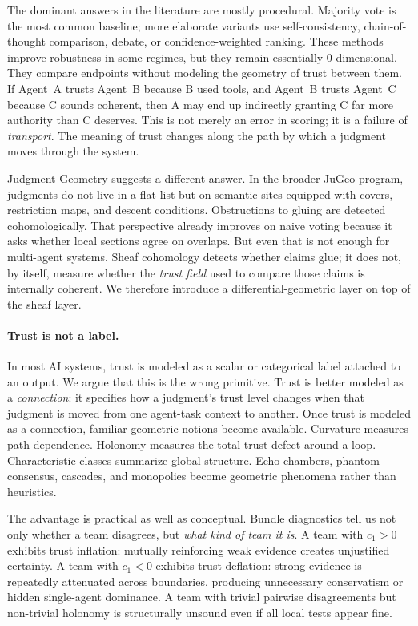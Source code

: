 \documentclass[11pt]{article}
\newcommand{\Chern}{c_1}
\begin{document}
The dominant answers in the literature are mostly procedural.  Majority vote is
the most common baseline; more elaborate variants use self-consistency,
chain-of-thought comparison, debate, or confidence-weighted ranking.  These
methods improve robustness in some regimes, but they remain essentially
0-dimensional.  They compare endpoints without modeling the geometry of trust
between them.  If Agent~A trusts Agent~B because B used tools, and Agent~B
trusts Agent~C because C sounds coherent, then A may end up indirectly granting
C far more authority than C deserves.  This is not merely an error in scoring;
it is a failure of \emph{transport}.  The meaning of trust changes along the
path by which a judgment moves through the system.

Judgment Geometry suggests a different answer.  In the broader JuGeo program,
judgments do not live in a flat list but on semantic sites equipped with covers,
restriction maps, and descent conditions.  Obstructions to gluing are detected
cohomologically.  That perspective already improves on naive voting because it
asks whether local sections agree on overlaps.  But even that is not enough for
multi-agent systems.  Sheaf cohomology detects whether claims glue; it does not,
by itself, measure whether the \emph{trust field} used to compare those claims is
internally coherent.  We therefore introduce a differential-geometric layer on
top of the sheaf layer.

\paragraph{Trust is not a label.}
In most AI systems, trust is modeled as a scalar or categorical label attached to
an output.  We argue that this is the wrong primitive.  Trust is better modeled
as a \emph{connection}: it specifies how a judgment's trust level changes when
that judgment is moved from one agent-task context to another.  Once trust is
modeled as a connection, familiar geometric notions become available.  Curvature
measures path dependence.  Holonomy measures the total trust defect around a
loop.  Characteristic classes summarize global structure.  Echo chambers,
phantom consensus, cascades, and monopolies become geometric phenomena rather
than heuristics.

The advantage is practical as well as conceptual.  Bundle diagnostics tell us
not only whether a team disagrees, but \emph{what kind of team it is}.  A team
with $\Chern > 0$ exhibits trust inflation: mutually reinforcing weak evidence
creates unjustified certainty.  A team with $\Chern < 0$ exhibits trust
deflation: strong evidence is repeatedly attenuated across boundaries, producing
unnecessary conservatism or hidden single-agent dominance.  A team with trivial
pairwise disagreements but non-trivial holonomy is structurally unsound even if
all local tests appear fine.
\end{document}
